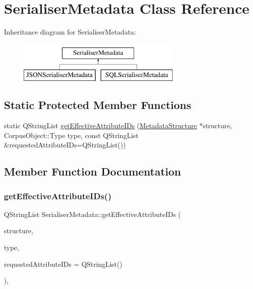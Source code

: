 \hypertarget{class_serialiser_metadata}{}\section{Serialiser\+Metadata Class Reference}
\label{class_serialiser_metadata}
Inheritance diagram for Serialiser\+Metadata\+:\begin{figure}[H]
\begin{center}
\leavevmode
\includegraphics[height=2.000000cm]{class_serialiser_metadata}
\end{center}
\end{figure}
\subsection*{Static Protected Member Functions}
\begin{DoxyCompactItemize}
\item 
static Q\+String\+List \hyperlink{class_serialiser_metadata_af9d4b19e983a3d15c95164fbb00f6359}{get\+Effective\+Attribute\+I\+Ds} (\hyperlink{class_metadata_structure}{Metadata\+Structure} $\ast$structure, Corpus\+Object\+::\+Type type, const Q\+String\+List \&requested\+Attribute\+I\+Ds=Q\+String\+List())
\end{DoxyCompactItemize}


\subsection{Member Function Documentation}
\mbox{\label{class_serialiser_metadata_af9d4b19e983a3d15c95164fbb00f6359}} 
\subsubsection{\texorpdfstring{get\+Effective\+Attribute\+I\+Ds()}{getEffectiveAttributeIDs()}}
{\footnotesize\ttfamily Q\+String\+List Serialiser\+Metadata\+::get\+Effective\+Attribute\+I\+Ds (\begin{DoxyParamCaption}\item[{\hyperlink{class_metadata_structure}{Metadata\+Structure} $\ast$}]{structure,  }\item[{Corpus\+Object\+::\+Type}]{type,  }\item[{const Q\+String\+List \&}]{requested\+Attribute\+I\+Ds = {\ttfamily QStringList()} }\end{DoxyParamCaption})\hspace{0.3cm}{\ttfamily [static]}, {\ttfamily [protected]}}

